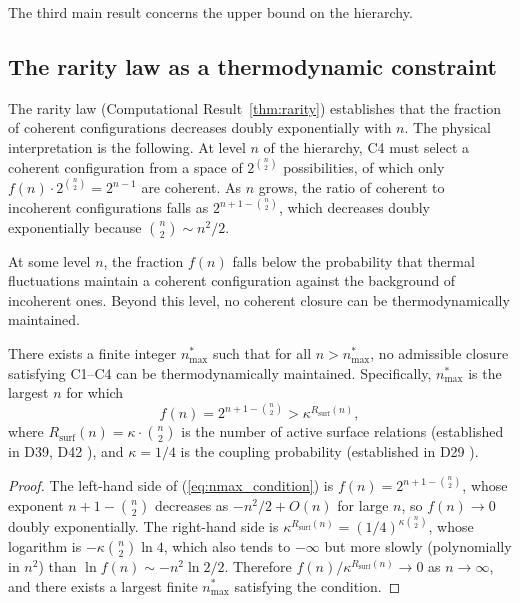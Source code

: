 \documentclass[12pt,a4paper]{article}
\newenvironment{theorembox}[1][]{%
  \begin{tcolorbox}[theoremstyle,title={Theorem%
    \ifx\relax#1\relax\else: #1\fi}]}{\end{tcolorbox}}
\theoremstyle{plain}
\theoremstyle{definition}
\theoremstyle{remark}
\newcommand{\kap}{\kappa}
\newcommand{\nmax}{n^{*}_{\mathrm{max}}}
\begin{document}
The third main result concerns the upper bound on the hierarchy.

\subsection{The rarity law as a thermodynamic constraint}

The rarity law (Computational Result~\ref{thm:rarity}) establishes that the fraction
of coherent configurations decreases doubly exponentially with $n$. The physical
interpretation is the following. At level $n$ of the hierarchy, C4 must select a
coherent configuration from a space of $2^{\binom{n}{2}}$ possibilities, of which
only $f(n) \cdot 2^{\binom{n}{2}} = 2^{n-1}$ are coherent. As $n$ grows, the ratio
of coherent to incoherent configurations falls as $2^{n+1-\binom{n}{2}}$, which
decreases doubly exponentially because $\binom{n}{2} \sim n^2/2$.

At some level $n$, the fraction $f(n)$ falls below the probability that thermal
fluctuations maintain a coherent configuration against the background of incoherent
ones. Beyond this level, no coherent closure can be thermodynamically maintained.

\begin{theorembox}[Finiteness of $\nmax$]
\label{thm:nmax}
There exists a finite integer $\nmax$ such that for all $n > \nmax$, no admissible
closure satisfying C1--C4 can be thermodynamically maintained. Specifically, $\nmax$
is the largest $n$ for which
\begin{equation}
f(n) = 2^{n+1-\binom{n}{2}} > \kap^{R_{\mathrm{surf}}(n)},
\label{eq:nmax_condition}
\end{equation}
where $R_{\mathrm{surf}}(n) = \kap \cdot \binom{n}{2}$ is the number of active
surface relations (established in D39, D42 \cite{D39,D42}), and $\kap = 1/4$ is the
coupling probability (established in D29 \cite{D29}).
\end{theorembox}

\begin{proof}
The left-hand side of (\ref{eq:nmax_condition}) is $f(n) = 2^{n+1-\binom{n}{2}}$,
whose exponent $n+1-\binom{n}{2}$ decreases as $-n^2/2 + O(n)$ for large $n$, so
$f(n) \to 0$ doubly exponentially. The right-hand side is $\kap^{R_{\mathrm{surf}}(n)}
= (1/4)^{\kap \binom{n}{2}}$, whose logarithm is $-\kap \binom{n}{2} \ln 4$, which
also tends to $-\infty$ but more slowly (polynomially in $n^2$) than $\ln f(n)
\sim -n^2 \ln 2 / 2$. Therefore $f(n)/\kap^{R_{\mathrm{surf}}(n)} \to 0$ as
$n \to \infty$, and there exists a largest finite $\nmax$ satisfying the condition.
\end{proof}
\end{document}

